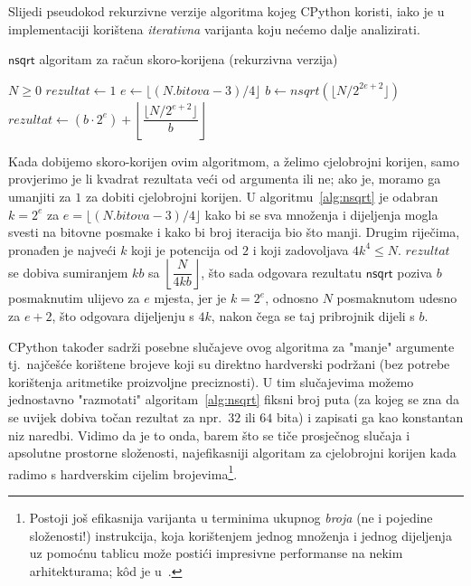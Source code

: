 \documentclass[12pt]{scrartcl}
\begin{document}
Slijedi pseudokod rekurzivne verzije algoritma kojeg CPython koristi, iako je u implementaciji korištena \emph{iterativna} varijanta koju nećemo
dalje analizirati.
\begin{algorithm}
    \caption{$\mathsf{nsqrt}$ algoritam za račun skoro-korijena (rekurzivna verzija)~\cite{mdickpaper}}\label{alg:nsqrt}
    \begin{algorithmic}[1]
    \Require $N \geq 0$
        \State $rezultat \gets 1$
    \Else
        \State $e \gets \lfloor(N.bitova - 3) / 4\rfloor$
        \State $b \gets nsqrt(\lfloor N / 2^{2e+2}\rfloor)$
        \State $rezultat \gets (b \cdot 2^e) + \left\lfloor \dfrac{\lfloor N / 2^{e+2}\rfloor}{b}\right\rfloor$
    \EndIf
    \end{algorithmic}
\end{algorithm}
Kada dobijemo skoro-korijen ovim algoritmom, a želimo cjelobrojni korijen, samo provjerimo je li kvadrat rezultata veći od argumenta ili ne;
ako je, moramo ga umanjiti za $1$ za dobiti cjelobrojni korijen.
U algoritmu~\ref{alg:nsqrt} je odabran $k=2^e$ za $e=\lfloor(N.bitova - 3) / 4\rfloor$ kako bi se sva množenja i dijeljenja mogla svesti
na bitovne posmake i kako bi broj iteracija bio što manji. Drugim riječima, pronađen je najveći $k$ koji je potencija od $2$ i koji
zadovoljava $4k^4 \leq N$. $rezultat$ se dobiva sumiranjem $kb$ sa $\left\lfloor\dfrac{N}{4kb}\right\rfloor$, što sada odgovara rezultatu
$\mathsf{nsqrt}$ poziva $b$ posmaknutim ulijevo za $e$ mjesta, jer je $k=2^e$, odnosno $N$ posmaknutom udesno za $e+2$, što odgovara
dijeljenju s $4k$, nakon čega se taj pribrojnik dijeli s $b$.

CPython također sadrži posebne slučajeve ovog algoritma za "manje" argumente tj.\ najčešće korištene brojeve koji su direktno hardverski
podržani (bez potrebe korištenja aritmetike proizvoljne preciznosti). U tim slučajevima možemo jednostavno "razmotati" algoritam~\ref{alg:nsqrt} fiksni
broj puta (za kojeg se zna da se uvijek dobiva točan rezultat za npr.\ $32$ ili $64$ bita) i zapisati ga kao konstantan niz naredbi. Vidimo da je to onda,
barem što se tiče prosječnog slučaja i apsolutne prostorne složenosti, najefikasniji algoritam za cjelobrojni korijen kada radimo s hardverskim
cijelim brojevima\footnote{Postoji još efikasnija varijanta u terminima ukupnog \emph{broja} (ne i pojedine složenosti!) instrukcija, koja korištenjem jednog
množenja i jednog
dijeljenja uz pomoćnu tablicu može postići impresivne performanse na nekim arhitekturama; k\^od je u~\cite{mdickpaper}.}.
\end{document}
